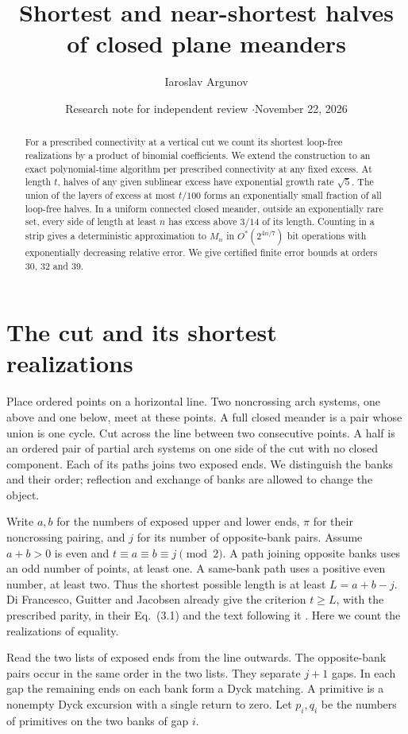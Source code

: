 \documentclass[11pt]{article}
\title{\bfseries Shortest and near-shortest halves\\of closed plane meanders}
\author{Iaroslav Argunov}
\date{Research note for independent review \enspace$\cdot$\enspace November 22, 2026}
\begin{document}
\maketitle
\begin{abstract}
For a prescribed connectivity at a vertical cut we count its shortest loop-free realizations by a product of binomial coefficients. We extend the construction to an exact polynomial-time algorithm per prescribed connectivity at any fixed excess. At length \(t\), halves of any given sublinear excess have exponential growth rate \(\sqrt5\). The union of the layers of excess at most \(t/100\) forms an exponentially small fraction of all loop-free halves. In a uniform connected closed meander, outside an exponentially rare set, every side of length at least \(n\) has excess above \(3/14\) of its length. Counting in a strip gives a deterministic approximation to \(M_n\) in \(O^*(2^{4n/7})\) bit operations with exponentially decreasing relative error. We give certified finite error bounds at orders 30, 32 and 39.
\end{abstract}

\section{The cut and its shortest realizations}
Place ordered points on a horizontal line. Two noncrossing arch systems, one above and one below, meet at these points. A full closed meander is a pair whose union is one cycle. Cut across the line between two consecutive points. A half is an ordered pair of partial arch systems on one side of the cut with no closed component. Each of its paths joins two exposed ends. We distinguish the banks and their order; reflection and exchange of banks are allowed to change the object.

Write \(a,b\) for the numbers of exposed upper and lower ends, \(\pi\) for their noncrossing pairing, and \(j\) for its number of opposite-bank pairs. Assume \(a+b>0\) is even and \(t\equiv a\equiv b\equiv j\pmod2\). A path joining opposite banks uses an odd number of points, at least one. A same-bank path uses a positive even number, at least two. Thus the shortest possible length is at least \(L=a+b-j\). Di Francesco, Guitter and Jacobsen already give the criterion \(t\ge L\), with the prescribed parity, in their Eq.~(3.1) and the text following it \cite{dfgj}. Here we count the realizations of equality.

Read the two lists of exposed ends from the line outwards. The opposite-bank pairs occur in the same order in the two lists. They separate \(j+1\) gaps. In each gap the remaining ends on each bank form a Dyck matching. A primitive is a nonempty Dyck excursion with a single return to zero. Let \(p_i,q_i\) be the numbers of primitives on the two banks of gap \(i\).
\end{document}
